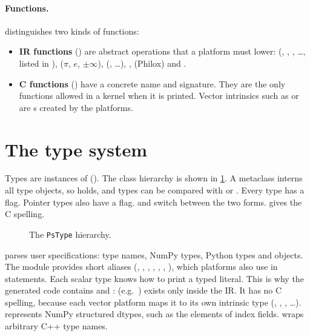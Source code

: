 \paragraph{Functions.}
 distinguishes two kinds of functions:
\begin{itemize}
  \item \textbf{IR functions} () are abstract operations that a
        platform must lower:  (, ,
        , \dots, listed in ), 
        ($\pi$, $e$, $\pm\infty$), 
        (, \dots), , 
        (Philox) and .
  \item \textbf{C functions} () have a concrete name and signature. They
        are the only functions allowed in a kernel when it is printed. Vector
        intrinsics such as  or  are
        s created by the platforms.
\end{itemize}

\section{The type system}\label{sec:types}

Types are instances of  (). The class hierarchy
is shown in \cref{fig:types}. A metaclass interns all type objects, so
 holds, and types can be compared with 
or \code{==}. Every type has a  flag. Pointer types also have a
 flag.  and  switch between the two
forms.  gives the C spelling.

\begin{figure}[htbp]
  \centering
  
  \caption[The \texttt{PsType} hierarchy]{The \texttt{PsType} hierarchy.}
  \label{fig:types}
\end{figure}

 parses user specifications: type names, NumPy types, Python types
and  objects. The module  provides short aliases
(, , , , ,
, ), which platforms also use in
 statements.
Each scalar type knows how to print a typed literal. This is why the generated code
contains  and :
 (e.g.\ ) exists only inside the IR. It has no C
spelling, because each vector platform maps it to its own intrinsic type
(, , , \dots). 
represents NumPy structured dtypes, such as the elements of index fields.
 wraps arbitrary C++ type names.

